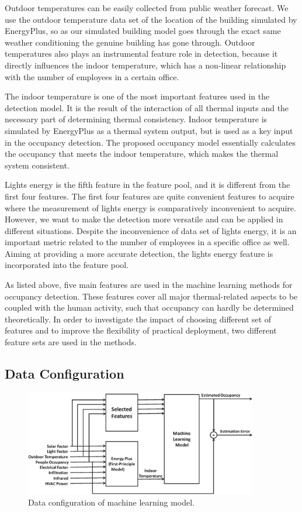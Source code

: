 Outdoor temperatures can be easily collected from public weather forecast. We
use the outdoor temperature data set of the location of the building simulated
by EnergyPlus, so as our simulated building model goes through the exact same
weather conditioning the genuine building has gone through. Outdoor
temperatures also plays an instrumental feature role in detection, because it
directly influences the indoor temperature, which has a non-linear relationship
with the number of employees in a certain office.

The indoor temperature is one of the most important features used in the
detection model. It is the result of the interaction of all thermal inputs and
the necessary part of determining thermal consistency. Indoor temperature is
simulated by EnergyPlus as a thermal system output, but is used as a key input
in the occupancy detection. The proposed occupancy model essentially calculates
the occupancy that meets the indoor temperature, which makes the thermal system
consistent.

Lights energy is the fifth feature in the feature pool, and it is
different from the first four features. The first four features are quite
convenient features to acquire where the measurement of lights energy
is comparatively inconvenient to acquire. However, we want to make the
detection more versatile and can be applied in different situations.
Despite the inconvenience of data set of lights energy, it is an
important metric related to the number of employees in a specific office
as well. Aiming at providing a more accurate detection, the lights
energy feature is incorporated into the feature pool.

As listed above, five main features are used in the
machine learning methods for occupancy detection.  These features cover all
major thermal-related aspects to be coupled with the human activity, such that
occupancy can hardly be determined theoretically. In order to investigate the
impact of choosing different set of features and to improve the flexibility of
practical deployment, two different feature sets are used in the methods.

\subsection{Data Configuration}
\begin{figure}[!h]
\centering
\includegraphics[width=4in]{./Pics/FlowDiagram2.eps}
\caption{Data configuration of machine learning model.}
\label{fig:SVRFlow}
\end{figure}

